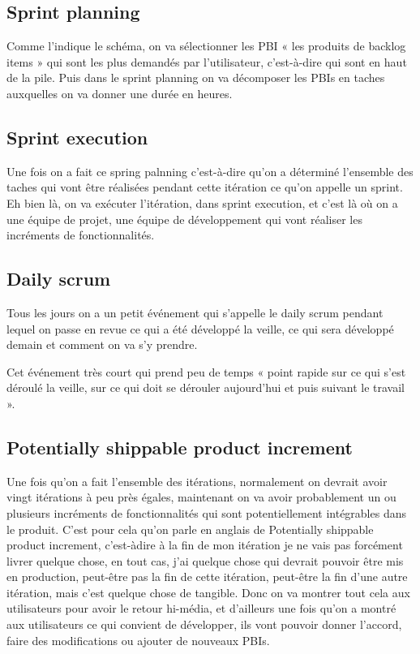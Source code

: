 \documentclass{article}           %
\begin{document}
\subsection{Sprint planning}
Comme l’indique le schéma, on va sélectionner les PBI « les produits de backlog items » qui
sont les plus demandés par l’utilisateur, c’est-à-dire qui sont en haut de la pile. Puis dans le
sprint planning on va décomposer les PBIs en taches auxquelles on va donner une durée en
heures.
\subsection{Sprint execution}
Une fois on a fait ce spring palnning c’est-à-dire qu’on a déterminé l’ensemble des taches qui
vont être réalisées pendant cette itération ce qu’on appelle un sprint. Eh bien là, on va exécuter
l’itération, dans sprint execution, et c’est là où on a une équipe de projet, une équipe de
développement qui vont réaliser les incréments de fonctionnalités.

\subsection{Daily scrum}
Tous les jours on a un petit événement qui s’appelle le daily scrum pendant lequel on passe en
revue ce qui a été développé la veille, ce qui sera développé demain et comment on va s’y
prendre.

Cet événement très court qui prend peu de temps « point rapide sur ce qui s’est déroulé la veille,
sur ce qui doit se dérouler aujourd’hui et puis suivant le travail ».


\subsection{Potentially shippable product increment}
Une fois qu’on a fait l’ensemble des itérations, normalement on devrait avoir vingt itérations à
peu près égales, maintenant on va avoir probablement un ou plusieurs incréments de
fonctionnalités qui sont potentiellement intégrables dans le produit.
C’est pour cela qu’on parle en anglais de Potentially shippable product increment, c’est-àdire à la fin de mon itération je ne vais pas forcément livrer quelque chose, en tout cas, j’ai
quelque chose qui devrait pouvoir être mis en production, peut-être pas la fin de cette itération,
peut-être la fin d’une autre itération, mais c’est quelque chose de tangible.
Donc on va montrer tout cela aux utilisateurs pour avoir le retour hi-média, et d’ailleurs une
fois qu’on a montré aux utilisateurs ce qui convient de développer, ils vont pouvoir donner
l’accord, faire des modifications ou ajouter de nouveaux PBIs.
\end{document}
